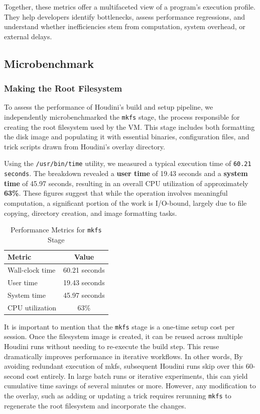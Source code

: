 \begin{doublespace}
Together, these metrics offer a multifaceted view of a program’s execution profile. They help developers identify bottlenecks, assess performance regressions, and understand whether inefficiencies stem from computation, system overhead, or external delays.


\subsection{Microbenchmark}

\subsubsection{Making the Root Filesystem}

To assess the performance of Houdini’s build and setup pipeline, we independently microbenchmarked the \texttt{mkfs} stage, the process responsible for creating the root filesystem used by the VM. This stage includes both formatting the disk image and populating it with essential binaries, configuration files, and trick scripts drawn from Houdini’s overlay directory.

Using the \texttt{/usr/bin/time} utility, we measured a typical execution time of \texttt{60.21 seconds}. The breakdown revealed a \textbf{user time} of 19.43 seconds and a \textbf{system time} of 45.97 seconds, resulting in an overall CPU utilization of approximately \textbf{63\%}. These figures suggest that while the operation involves meaningful computation, a significant portion of the work is I/O-bound, largely due to file copying, directory creation, and image formatting tasks.

\begin{table}[h]
\centering
\caption{Performance Metrics for \texttt{mkfs} Stage}
\label{tab:mkfs-performance}
\begin{tabular}{|l|c|}
\hline
\textbf{Metric}         & \textbf{Value} \\
\hline
Wall-clock time         & 60.21 seconds \\
User time               & 19.43 seconds \\
System time             & 45.97 seconds \\
CPU utilization         & 63\% \\
\hline
\end{tabular}
\end{table}


It is important to mention that the \texttt{mkfs} stage is a one-time setup cost per session. Once the filesystem image is created, it can be reused across multiple Houdini runs without needing to re-execute the build step. This reuse dramatically improves performance in iterative workflows. In other words, By avoiding redundant execution of mkfs, subsequent Houdini runs skip over this 60-second cost entirely. In large batch runs or iterative experiments, this can yield cumulative time savings of several minutes or more. However, any modification to the overlay, such as adding or updating a trick requires rerunning \texttt{mkfs} to regenerate the root filesystem and incorporate the changes.



\end{doublespace}

